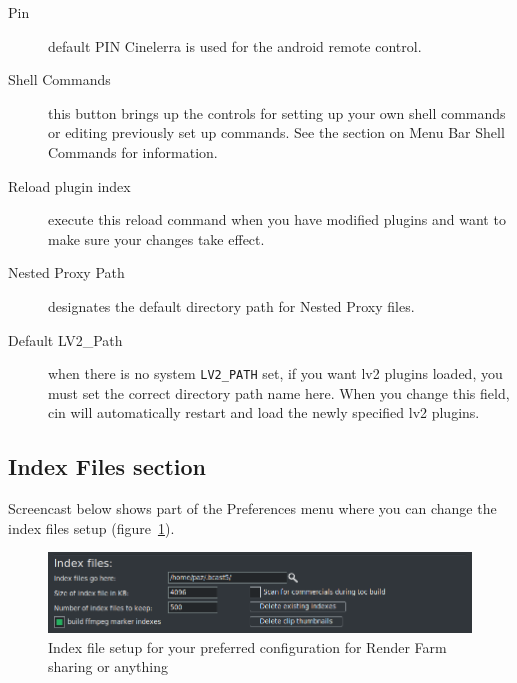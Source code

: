 \begin{description}
    \item[Pin] default PIN Cinelerra is used for the android remote control.
    \item[Shell Commands] this button brings up the controls for setting up your own shell commands or editing previously set up commands.  See the section on Menu Bar Shell Commands for information.
    \item[Reload plugin index] execute this reload command when you have modified plugins and want to make sure your changes take effect.
    \item[Nested Proxy Path] designates the default directory path for Nested Proxy files.
    \item[Default LV2\_Path] when there is no system \texttt{LV2\_PATH} set, if you want lv2 plugins loaded, you must set the correct directory path name here. When you change this field, cin will automatically restart and load the newly specified lv2 plugins.
\end{description}

\subsection{Index Files section}%

\label{sub:index_file_section}
Screencast below shows part of the Preferences menu where you can change the index files setup (figure~\ref{fig:index}).
\begin{figure}[htpb]
    \centering
    \includegraphics[width=1.0\linewidth]{images/index.png}
    \caption{Index file setup for your preferred configuration for Render Farm sharing or anything}
    \label{fig:index}
\end{figure}

